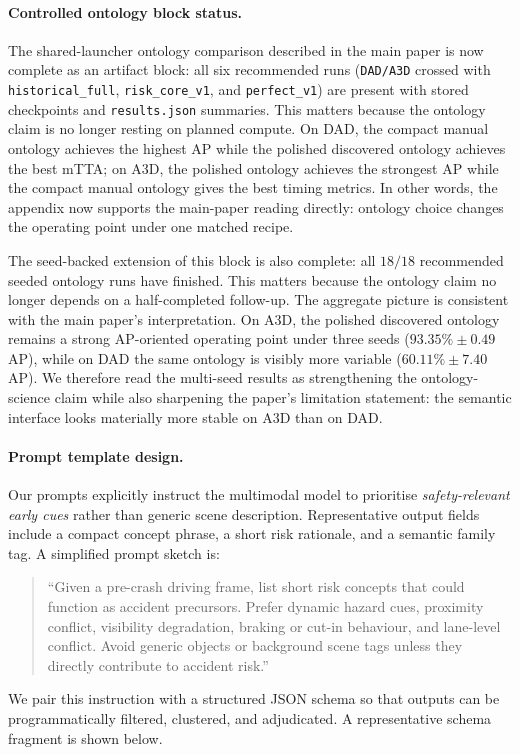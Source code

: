 \paragraph{Controlled ontology block status.}
The shared-launcher ontology comparison described in the main paper is now
complete as an artifact block: all six recommended runs
(\texttt{DAD/A3D} crossed with \texttt{historical\_full},
\texttt{risk\_core\_v1}, and \texttt{perfect\_v1}) are present with stored
checkpoints and \texttt{results.json} summaries. This matters because the
ontology claim is no longer resting on planned compute. On DAD, the compact
manual ontology achieves the highest AP while the polished discovered ontology
achieves the best mTTA; on A3D, the polished ontology achieves the strongest AP
while the compact manual ontology gives the best timing metrics. In other
words, the appendix now supports the main-paper reading directly: ontology
choice changes the operating point under one matched recipe.

The seed-backed extension of this block is also complete: all $18/18$
recommended seeded ontology runs have finished. This matters because the
ontology claim no longer depends on a half-completed follow-up.
The aggregate picture is consistent with the main paper's interpretation. On
A3D, the polished discovered ontology remains a strong AP-oriented operating
point under three seeds ($93.35\%\pm0.49$ AP), while on DAD the same ontology
is visibly more variable ($60.11\%\pm7.40$ AP). We therefore read the multi-seed
results as strengthening the ontology-science claim while also sharpening the
paper's limitation statement: the semantic interface looks materially more
stable on A3D than on DAD.

\paragraph{Prompt template design.}
Our prompts explicitly instruct the multimodal model to prioritise
\emph{safety-relevant early cues} rather than generic scene description.
Representative output fields include a compact concept phrase, a short risk
rationale, and a semantic family tag. A simplified prompt sketch is:
\begin{quote}
``Given a pre-crash driving frame, list short risk concepts that could function
as accident precursors. Prefer dynamic hazard cues, proximity conflict,
visibility degradation, braking or cut-in behaviour, and lane-level conflict.
Avoid generic objects or background scene tags unless they directly contribute
to accident risk.''
\end{quote}
We pair this instruction with a structured JSON schema so that outputs can be
programmatically filtered, clustered, and adjudicated. A representative schema
fragment is shown below.


